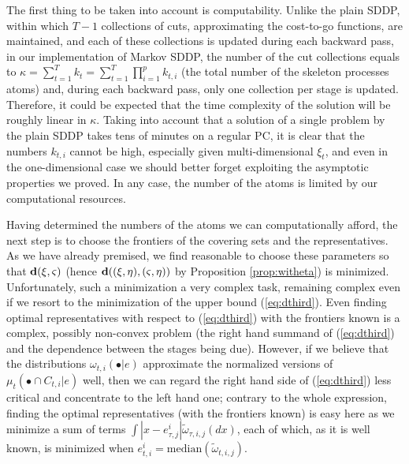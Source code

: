 \documentclass{article}              %
\begin{document}
The first thing to be taken into account is computability. Unlike
the plain SDDP, within which $T-1$ collections of cuts, approximating
the cost-to-go functions, are maintained, and each of these collections
is updated during each backward pass, in our implementation of Markov SDDP, the number
of the cut collections equals to $\kappa=\sum_{t=1}^{T}k_{t}=\sum_{t=1}^{T}\prod_{i=1}^{p}k_{t,i}$
(the total number of the skeleton processes atoms) and, during each
backward pass, only one collection per stage is updated. Therefore,
it could be expected that the time complexity of the solution will
be roughly linear in $\kappa$. Taking into account that a solution of a single problem by the plain
SDDP takes tens of minutes on a regular PC, it is clear that the numbers $k_{t,i}$ cannot be
high, especially given multi-dimensional $\xi_{t}$, and even
in the one-dimensional case we should better forget exploiting the
asymptotic properties we proved. In any case, the number of the atoms
is limited by our computational resources.

Having determined the numbers of the atoms we can computationally afford, the next step is to choose the
frontiers of the covering sets and the representatives. As we have
already premised, we find reasonable to choose these parameters so
that $\mathbf{d}(\xi,\varsigma)$ (hence $\mathbf{d}((\xi,\eta),(\varsigma,\eta))$
by Proposition \ref{prop:witheta}) is minimized. 
Unfortunately, such a minimization a very complex task, remaining
complex even if we resort to the minimization of the upper bound (\ref{eq:dthird}).
Even finding optimal representatives with respect to (\ref{eq:dthird})
with the frontiers known is a complex, possibly non-convex problem
(the right hand summand of (\ref{eq:dthird}) and the dependence between
the stages being due). However, if we believe that the distributions
$\omega_{t,i}(\bullet|e)$ approximate the normalized versions of
$\mu_{t}(\bullet\cap C_{t,i}|e)$ well, then we can regard the right
hand side of (\ref{eq:dthird}) less critical and concentrate to the
left hand one; contrary to the whole expression, finding the optimal
representatives (with the frontiers known) is easy here as we minimize a sum of terms $\int|x-e_{\tau,j}^{i}|\tilde{\omega}_{\tau,i,j}(dx)$,
each of which, as it is well known, is minimized when $e_{t,i}^{i}=\mathrm{median}(\tilde{\omega}_{t,i,j})$.
\end{document}
